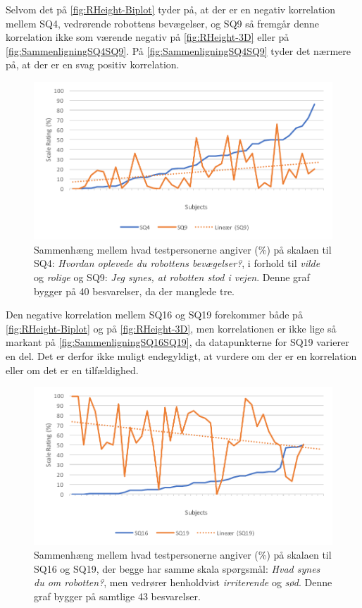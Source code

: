 \noindent
%
Selvom det på \autoref{fig:RHeight-Biplot} tyder på, at der er en negativ korrelation mellem SQ4, vedrørende robottens bevægelser, og SQ9 så fremgår denne korrelation ikke som værende negativ på \autoref{fig:RHeight-3D} eller på \autoref{fig:SammenligningSQ4SQ9}. På \autoref{fig:SammenligningSQ4SQ9} tyder det nærmere på, at der er en svag positiv korrelation. 
%
\begin{figure}[H]
	\centering
	\includegraphics[width=\textwidth]{Figure/Korrelationsgrafer/SQ4+SQ9}
	\caption{Sammenhæng mellem hvad testpersonerne angiver (\%) på skalaen til SQ4: \textit{Hvordan oplevede du robottens bevægelser?}, i forhold til \textit{vilde} og \textit{rolige} og SQ9: \textit{Jeg synes, at robotten stod i vejen}. Denne graf bygger på 40 besvarelser, da der manglede tre.}
	\label{fig:SammenligningSQ4SQ9}
\end{figure}
\noindent
%
Den negative korrelation mellem SQ16 og SQ19 forekommer både på \autoref{fig:RHeight-Biplot} og på \autoref{fig:RHeight-3D}, men korrelationen er ikke lige så markant på \autoref{fig:SammenligningSQ16SQ19}, da datapunkterne for SQ19 varierer en del. Det er derfor ikke muligt endegyldigt, at vurdere om der er en korrelation eller om det er en tilfældighed. 
%
\begin{figure}[H]
	\centering
	\includegraphics[width=\textwidth]{Figure/Korrelationsgrafer/SQ16+SQ19}
	\caption{Sammenhæng mellem hvad testpersonerne angiver (\%) på skalaen til SQ16 og SQ19, der begge har samme skala spørgsmål: \textit{Hvad synes du om robotten?}, men vedrører henholdvist \textit{irriterende} og \textit{sød}. Denne graf bygger på samtlige 43 besvarelser.}
	\label{fig:SammenligningSQ16SQ19}
\end{figure}
\noindent
%


